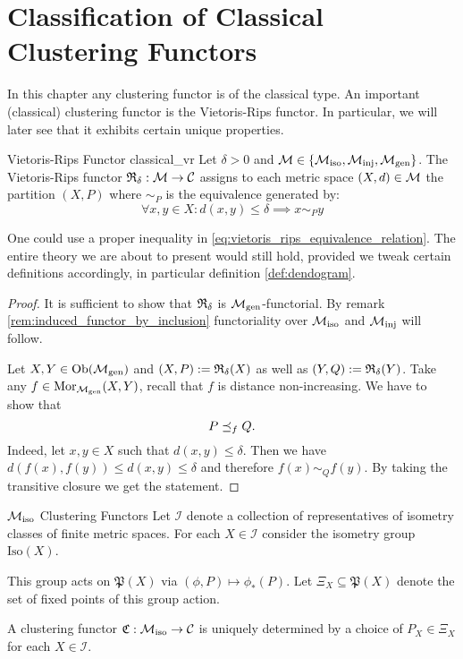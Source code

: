 \chapter{Classification of Classical Clustering Functors}
\label{chapter__classical}
In this chapter any clustering functor is of the classical type.
An important (classical) clustering functor is the Vietoris-Rips functor.
In particular, we will later see that it exhibits certain unique properties.

\begin{defprop}{Vietoris-Rips Functor \cite[Def.~6.1]{Carlsson2010}}{classical_vr}
    Let $\delta > 0$ and $\mathcal{M} \in \{{\mathcal{M}_\mathrm{iso}}, {\mathcal{M}_\mathrm{inj}}, {\mathcal{M}_\mathrm{gen}}\}$. The Vietoris-Rips functor $\mathfrak{R}_\delta: \mathcal{M} \to \mathcal{C}$ assigns to each metric space $(X,d) \in \mathcal{M}$ the partition $(X,P)$ where $\sim_P$ is the equivalence generated by:
    \begin{equation}
        \label{eq:vietoris_rips_equivalence_relation}
        \forall x,y \in X: d(x,y) \leq \delta \implies x \sim_P y
    \end{equation}
\end{defprop}

One could use a proper inequality in \eqref{eq:vietoris_rips_equivalence_relation}. The entire theory we are about to present would still hold, provided we tweak certain definitions accordingly, in particular definition \ref{def:dendogram}.

\begin{proof}
It is sufficient to show that $\mathfrak{R}_\delta$ is ${\mathcal{M}_\mathrm{gen}}$-functorial. By remark \ref{rem:induced_functor_by_inclusion} functoriality over ${\mathcal{M}_\mathrm{iso}}$ and ${\mathcal{M}_\mathrm{inj}}$ will follow.

Let $X,Y \in \mathrm {Ob}({\mathcal{M}_\mathrm{gen}})$ and $(X,P) := \mathfrak{R}_\delta(X)$ as well as $(Y,Q) := \mathfrak{R}_\delta(Y)$.
Take any $f \in \mathrm {Mor}_{\mathcal{M}_\mathrm{gen}}(X,Y)$, recall that $f$ is distance non-increasing.
We have to show that 
$$P \preceq_f Q.$$
Indeed, let $x,y \in X$ such that $d(x,y) \leq \delta$.
Then we have $d(f(x), f(y)) \leq d(x,y) \leq \delta$ and therefore $f(x) \sim_{Q} f(y)$.
By taking the transitive closure we get the statement.
\end{proof}

\begin{myremark}{${\mathcal{M}_\mathrm{iso}}$ Clustering Functors \cite[Thm.~6.1]{Carlsson2010}}{}
Let $\mathcal{I}$ denote a collection of representatives of isometry classes of finite metric spaces.
For each $X \in \mathcal{I}$ consider the isometry group $\mathrm{Iso}(X)$. \par

\medskip This group acts on $\mathfrak{P}(X)$ via $(\phi, P) \mapsto \phi_*(P)$.
Let $\Xi_X \subseteq \mathfrak{P}(X)$ denote the set of fixed points of this group action. \par

\medskip A clustering functor $\mathfrak{C}: {\mathcal{M}_\mathrm{iso}} \to \mathcal{C}$ is uniquely determined by a choice of $P_X \in \Xi_X$ for each $X \in \mathcal{I}$.
\end{myremark}

